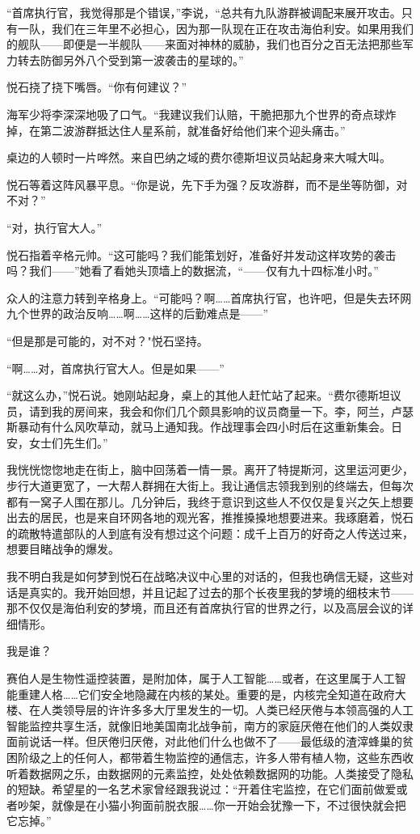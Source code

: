\documentclass[AutoFakeBold=true]{book}
\begin{document}
``首席执行官，我觉得那是个错误，''李说，``总共有九队游群被调配来展开攻击。只有一队，我们在三年里不必担心，因为那一队现在正在攻击海伯利安。如果用我们的舰队——即便是一半舰队——来面对神林的威胁，我们也百分之百无法把那些军力转去防御另外八个受到第一波袭击的星球的。''

悦石挠了挠下嘴唇。``你有何建议？''

海军少将李深深地吸了口气。``我建议我们认赔，干脆把那九个世界的奇点球炸掉，在第二波游群抵达住人星系前，就准备好给他们来个迎头痛击。''

桌边的人顿时一片哗然。来自巴纳之域的费尔德斯坦议员站起身来大喊大叫。

悦石等着这阵风暴平息。``你是说，先下手为强？反攻游群，而不是坐等防御，对不对？''

``对，执行官大人。''

悦石指着辛格元帅。``这可能吗？我们能策划好，准备好并发动这样攻势的袭击吗？我们——''她看了看她头顶墙上的数据流，``——仅有九十四标准小时。''

众人的注意力转到辛格身上。``可能吗？啊……首席执行官，也许吧，但是失去环网九个世界的政治反响……啊……这样的后勤难点是——''

``但是那是可能的，对不对？"悦石坚持。

``啊……对，首席执行官大人。但是如果——''

``就这么办，''悦石说。她刚站起身，桌上的其他人赶忙站了起来。``费尔德斯坦议员，请到我的房间来，我会和你们几个颇具影响的议员商量一下。李，阿兰，卢瑟斯暴动有什么风吹草动，就马上通知我。作战理事会四小时后在这重新集会。日安，女士们先生们。''

\vspace*{1em}

我恍恍惚惚地走在街上，脑中回荡着一情一景。离开了特提斯河，这里运河更少，步行大道更宽了，一大帮人群拥在大街上。我让通信志领我到别的终端去，但每次都有一窝子人围在那儿。几分钟后，我终于意识到这些人不仅仅是复兴之矢上想要出去的居民，也是来自环网各地的观光客，推推搡搡地想要进来。我琢磨着，悦石的疏散特遣部队的人到底有没有想过这个问题：成千上百万的好奇之人传送过来，想要目睹战争的爆发。

我不明白我是如何梦到悦石在战略决议中心里的对话的，但我也确信无疑，这些对话是真实的。我开始回想，并且记起了过去的那个长夜里我的梦境的细枝末节——那不仅仅是海伯利安的梦境，而且还有首席执行官的世界之行，以及高层会议的详细情形。

{\kaishu 我是谁？}

赛伯人是生物性遥控装置，是附加体，属于人工智能……或者，在这里属于人工智能重建人格……它们安全地隐藏在内核的某处。重要的是，内核完全知道在政府大楼、在人类领导层的许许多多大厅里发生的一切。人类已经厌倦与本领高强的人工智能监控共享生活，就像旧地美国南北战争前，南方的家庭厌倦在他们的人类奴隶面前说话一样。但厌倦归厌倦，对此他们什么也做不了——最低级的渣滓蜂巢的贫困阶级之上的任何人，都带着生物监控的通信志，许多人带有植人物，这些东西收听着数据网之乐，由数据网的元素监控，处处依赖数据网的功能。人类接受了隐私的短缺。希望星的一名艺术家曾经跟我说过：``开着住宅监控，在它们面前做爱或者吵架，就像是在小猫小狗面前脱衣服……你一开始会犹豫一下，不过很快就会把它忘掉。''
\end{document}
